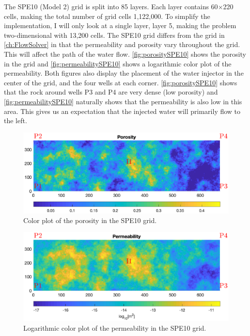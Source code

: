 The SPE10 (Model 2) grid is split into 85 layers. Each layer contains 60$\times$220 cells, making the total number of grid cells 1,122,000. To simplify the implementation, I will only look at a single layer, layer 5, making the problem two-dimensional with 13,200 cells. The SPE10 grid differs from the grid in \autoref{ch:FlowSolver} in that the permeability and porosity vary throughout the grid. This will affect the path of the water flow. \autoref{fig:porositySPE10} shows the porosity in the grid and \autoref{fig:permeabilitySPE10} shows a logarithmic color plot of the permeability. Both figures also display the placement of the water injector in the center of the grid, and the four wells at each corner. \autoref{fig:porositySPE10} shows that the rock around wells P3 and P4 are very dense (low porosity) and \autoref{fig:permeabilitySPE10} naturally shows that the permeability is also low in this area. This gives us an expectation that the injected water will primarily flow to the left.
\begin{figure}[H]
    \centering
    \includegraphics[width = \textwidth,clip=true,trim=20 130 10 90]{figures/porositySPE10.eps}
    \caption{Color plot of the porosity in the SPE10 grid.}
    \label{fig:porositySPE10}
\end{figure}
\begin{figure}[H]
    \centering
    \includegraphics[width = \textwidth,clip=true,trim=20 120 10 90]{figures/permeabilitySPE10.eps}
    \caption{Logarithmic color plot of the permeability in the SPE10 grid.}
    \label{fig:permeabilitySPE10}
\end{figure}

